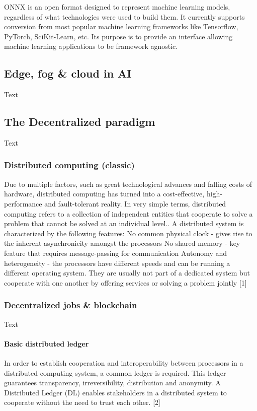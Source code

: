 \documentclass{article}
\begin{document}
ONNX is an open format designed to represent machine learning models, regardless of what technologies were used to build them. It currently supports conversion from most popular machine learning frameworks like Tensorflow, PyTorch, SciKit-Learn, etc. Its purpose is to provide an interface allowing machine learning applications to be framework agnostic.

\subsection{Edge, fog \& cloud in AI }
Text
\subsection{The Decentralized paradigm}
Text
\subsubsection{Distributed computing (classic)}
Due to multiple factors, such as great technological advances and falling costs of hardware, distributed computing has turned into a cost-effective, high-performance and fault-tolerant reality. In very simple terms, distributed computing refers to a collection of independent entities that cooperate to solve a problem that cannot be solved at an individual level.. 
A distributed system is characterized by the following features:
No common physical clock - gives rise to the inherent asynchronicity amongst the processors
No shared memory - key feature that requires message-passing for communication
Autonomy and heterogeneity - the processors have different speeds and can be running a different operating system. They are usually not part of a dedicated system but cooperate with one another by offering services or solving a problem jointly [1]
\subsubsection{Decentralized jobs \& blockchain}
Text
\paragraph{Basic distributed ledger}
In order to establish cooperation and interoperability between processors in a distributed computing system, a common ledger is required. This ledger guarantees transparency, irreversibility, distribution and anonymity. A Distributed Ledger (DL) enables stakeholders in a distributed system to cooperate without the need to trust each other. [2]
\end{document}
